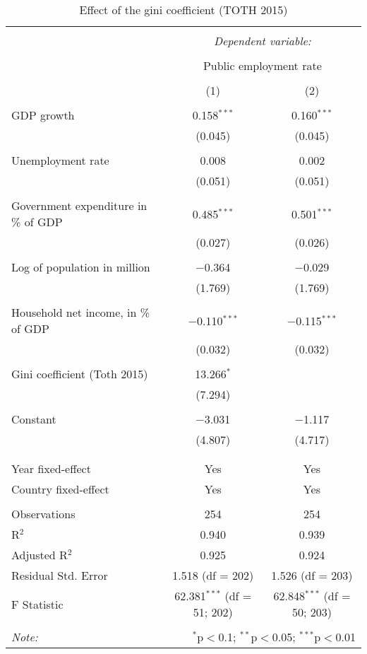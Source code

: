 
\begin{table}[!htbp] \centering 
  \caption{Effect of the gini coefficient (TOTH 2015)} 
  \label{} 
\begin{tabular}{@{\extracolsep{5pt}}lcc} 
\\[-1.8ex]\hline 
\hline \\[-1.8ex] 
 & \multicolumn{2}{c}{\textit{Dependent variable:}} \\ 
\cline{2-3} 
\\[-1.8ex] & \multicolumn{2}{c}{Public employment rate} \\ 
\\[-1.8ex] & (1) & (2)\\ 
\hline \\[-1.8ex] 
 GDP growth & 0.158$^{***}$ & 0.160$^{***}$ \\ 
  & (0.045) & (0.045) \\ 
  & & \\ 
 Unemployment rate & 0.008 & 0.002 \\ 
  & (0.051) & (0.051) \\ 
  & & \\ 
 Government expenditure in \% of GDP & 0.485$^{***}$ & 0.501$^{***}$ \\ 
  & (0.027) & (0.026) \\ 
  & & \\ 
 Log of population in million & $-$0.364 & $-$0.029 \\ 
  & (1.769) & (1.769) \\ 
  & & \\ 
 Household net income, in \% of GDP & $-$0.110$^{***}$ & $-$0.115$^{***}$ \\ 
  & (0.032) & (0.032) \\ 
  & & \\ 
 Gini coefficient (Toth 2015) & 13.266$^{*}$ &  \\ 
  & (7.294) &  \\ 
  & & \\ 
 Constant & $-$3.031 & $-$1.117 \\ 
  & (4.807) & (4.717) \\ 
  & & \\ 
\hline \\[-1.8ex] 
Year fixed-effect & Yes & Yes \\ 
Country fixed-effect & Yes & Yes \\ 
\hline \\[-1.8ex] 
Observations & 254 & 254 \\ 
R$^{2}$ & 0.940 & 0.939 \\ 
Adjusted R$^{2}$ & 0.925 & 0.924 \\ 
Residual Std. Error & 1.518 (df = 202) & 1.526 (df = 203) \\ 
F Statistic & 62.381$^{***}$ (df = 51; 202) & 62.848$^{***}$ (df = 50; 203) \\ 
\hline 
\hline \\[-1.8ex] 
\textit{Note:}  & \multicolumn{2}{r}{$^{*}$p$<$0.1; $^{**}$p$<$0.05; $^{***}$p$<$0.01} \\ 
\end{tabular} 
\end{table} 
